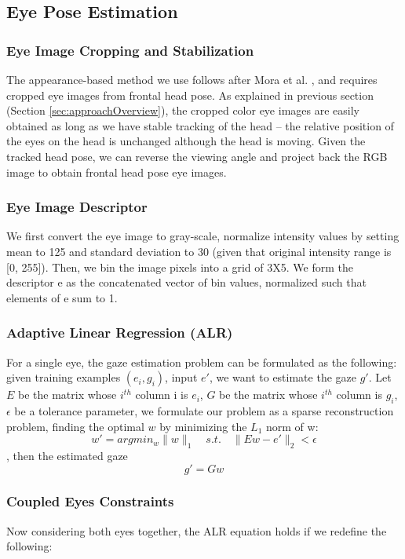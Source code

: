 \documentclass{ut-thesis}
\begin{document}
\subsection{Eye Pose Estimation}

\subsubsection{Eye Image Cropping and Stabilization}
The appearance-based method we use follows after Mora et al. \cite{funes2013person}, and requires cropped eye images from frontal head pose.  As explained in previous section (Section \ref{sec:approachOverview}), the cropped color eye images are easily obtained as long as we have stable tracking of the head -- the relative position of the eyes on the head is unchanged although the head is moving.  Given the tracked head pose, we can reverse the viewing angle and project back the RGB image to obtain frontal head pose eye images.


\subsubsection{Eye Image Descriptor}
We first convert the eye image to gray-scale, normalize intensity values by setting mean to 125 and standard deviation to 30 (given that original intensity range is [0, 255]).  Then, we bin the image pixels into a grid of 3X5.  We form the descriptor e as the concatenated vector of bin values, normalized such that elements of e sum to 1.


\subsubsection{Adaptive Linear Regression (ALR)}
For a single eye, the gaze estimation problem can be formulated as the following: given training examples \( {(e_i,g_i )} \), input \(e'\), we want to estimate the gaze \(g'\).
Let \(E\) be the matrix whose \(i^{th}\) column i is \( e_i \), \(G\) be the matrix whose \(i^{th}\) column is \(g_i\), \(\epsilon\) be a tolerance parameter, we formulate our problem as a sparse reconstruction problem, finding the optimal \(w\) by minimizing the \(L_1\) norm of w:
\[ w' = argmin_w \|w\|_1  \quad  s.t.   \quad   \|Ew - e'\|_2 < \epsilon   \]
, then the estimated gaze \[ g' = Gw \]


\subsubsection{Coupled Eyes Constraints}
Now considering both eyes together, the ALR equation holds if we redefine the following:
\end{document}
